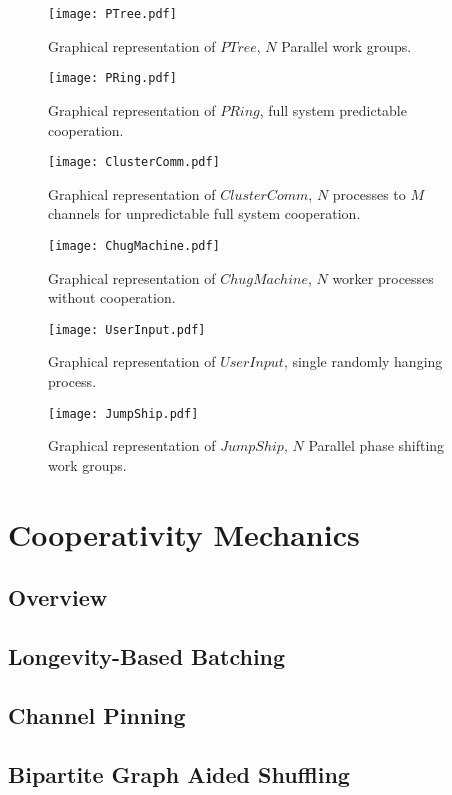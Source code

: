 \begin{figure}
\centering
\texttt{[image: PTree.pdf]}
\caption{Graphical representation of $PTree$, $N$ Parallel work groups.}
\label{fig:PTree}
\end{figure}

\begin{figure}
\centering
\texttt{[image: PRing.pdf]}
\caption{Graphical representation of $PRing$, full system predictable 
cooperation.}
\label{fig:PRing}
\end{figure}

\begin{figure}
\centering
\texttt{[image: ClusterComm.pdf]}
\caption{Graphical representation of $ClusterComm$, $N$ processes to $M$ 
channels for unpredictable full system cooperation.}
\label{fig:ClusterComm}
\end{figure}

\begin{figure}
\centering
\texttt{[image: ChugMachine.pdf]}
\caption{Graphical representation of $ChugMachine$, $N$ worker processes 
without cooperation.}
\label{fig:}
\end{figure}

\begin{figure}
\centering
\texttt{[image: UserInput.pdf]}
\caption{Graphical representation of $UserInput$, single randomly hanging 
process.}
\label{fig:}
\end{figure}

\begin{figure}
\centering
\texttt{[image: JumpShip.pdf]}
\caption{Graphical representation of $JumpShip$, $N$ Parallel phase shifting 
work groups.}
\label{fig:JumpShip}
\end{figure}





\section{Cooperativity Mechanics}\label{sec:cooperativity mechanics}

\subsection{Overview}\label{sec:cooperativity mechanics overview}
\subsection{Longevity-Based Batching}\label{sec:longevity based batching}
\subsection{Channel Pinning}\label{sec:channel pinning}
\subsection{Bipartite Graph Aided Shuffling}
    \label{sec:bipartite graph aided shuffling}


